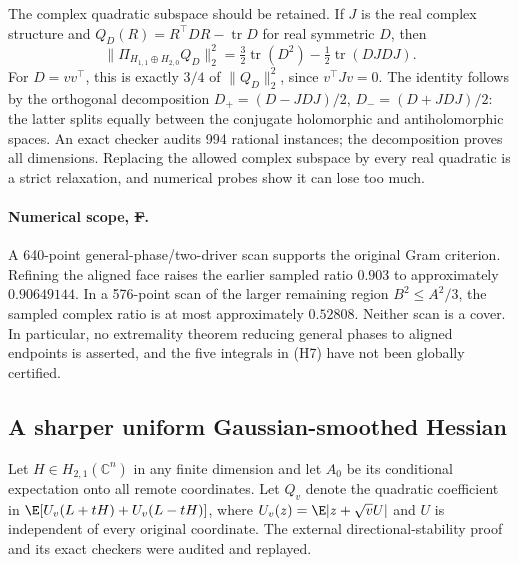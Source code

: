 The complex quadratic subspace should be retained. If $J$ is the real
complex structure and $Q_D(R)=R^\top D R-\operatorname{tr}D$ for real
symmetric $D$, then
\[
 \|\Pi_{H_{1,1}\oplus H_{2,0}}Q_D\|_2^2
 =\tfrac32\operatorname{tr}(D^2)-\tfrac12\operatorname{tr}(DJDJ).
\]
For $D=vv^\top$, this is exactly $3/4$ of $\|Q_D\|_2^2$, since
$v^\top Jv=0$. The identity follows by the orthogonal decomposition
$D_+=(D-JDJ)/2$, $D_-=(D+JDJ)/2$: the latter splits equally between
the conjugate holomorphic and antiholomorphic spaces. An exact checker
audits 994 rational instances; the decomposition proves all dimensions.
Replacing the allowed complex subspace by every real quadratic is a
strict relaxation, and numerical probes show it can lose too much.

\paragraph{Numerical scope, \st{F}.}
A 640-point general-phase/two-driver scan supports the original Gram
criterion. Refining the aligned face raises the earlier sampled ratio
$0.903$ to approximately $0.90649144$. In a 576-point scan of the larger
remaining region $B^2\le A^2/3$, the sampled complex ratio is at most
approximately $0.52808$. Neither scan is a cover. In particular, no
extremality theorem reducing general phases to aligned endpoints is
asserted, and the five integrals in (H7) have not been globally certified.

\subsection{A sharper uniform Gaussian-smoothed Hessian}
\label{sec:all-v-hessian}
Let $H\in H_{2,1}(\mathbb C^n)$ in any finite dimension and let $A_0$ be its conditional expectation
onto all remote coordinates. Let $Q_v$ denote the quadratic coefficient
in $\E[U_v(L+tH)+U_v(L-tH)]$, where
$U_v(z)=\E|z+\sqrt v U|$ and $U$ is independent of every original
coordinate. The external directional-stability proof and its exact
checkers were audited and replayed.

